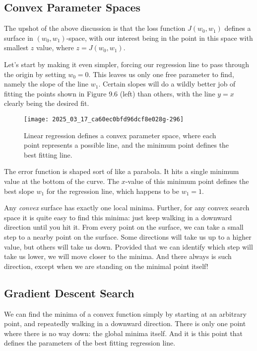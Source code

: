 \documentclass[10pt]{article}
\begin{document}
\subsection{Convex Parameter Spaces}
The upshot of the above discussion is that the loss function $J(w_{0}, w_{1})$ defines a surface in $(w_{0}, w_{1})$-space, with our interest being in the point in this space with smallest $z$ value, where $z=J(w_{0}, w_{1})$.

Let’s start by making it even simpler, forcing our regression line to pass through the origin by setting $w_{0}=0$. This leaves us only one free parameter to find, namely the slope of the line $w_{1}$. Certain slopes will do a wildly better job of fitting the points shown in Figure 9.6 (left) than others, with the line $y=x$ clearly being the desired fit.

\begin{figure}[h]
    \centering
    \texttt{[image: 2025\_03\_17\_ca60ec0bfd96dcf8e028g-296]}
    \caption{Linear regression defines a convex parameter space, where each point represents a possible line, and the minimum point defines the best fitting line.}
\end{figure}

The error function is shaped sort of like a parabola. It hits a single minimum value at the bottom of the curve. The $x$-value of this minimum point defines the best slope $w_{1}$ for the regression line, which happens to be $w_{1}=1$.

Any \textit{convex} surface has exactly one local minima. Further, for any convex search space it is quite easy to find this minima: just keep walking in a downward direction until you hit it. From every point on the surface, we can take a small step to a nearby point on the surface. Some directions will take us up to a higher value, but others will take us down. Provided that we can identify which step will take us lower, we will move closer to the minima. And there always is such direction, except when we are standing on the minimal point itself!

\subsection{Gradient Descent Search}
We can find the minima of a convex function simply by starting at an arbitrary point, and repeatedly walking in a downward direction. There is only one point where there is no way down: the global minima itself. And it is this point that defines the parameters of the best fitting regression line.
\end{document}
